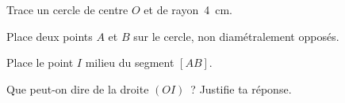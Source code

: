\begin{myenumerate}
  \item Trace un cercle de centre $O$ et de rayon 4~cm.
  \item Place deux points $A$ et $B$ sur le cercle, non diamétralement opposés.
  \item Place le point $I$ milieu du segment $[AB]$.
  \item Que peut-on dire de la droite $(OI)$ ? Justifie ta réponse.
\end{myenumerate}